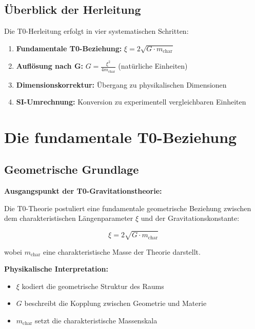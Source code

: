 \documentclass[12pt,a4paper]{article}
\begin{document}
	\subsection{Überblick der Herleitung}
	
	Die T0-Herleitung erfolgt in vier systematischen Schritten:
	
	\begin{enumerate}
		\item \textbf{Fundamentale T0-Beziehung:} $\xi = 2\sqrt{G \cdot m_{\text{char}}}$
		\item \textbf{Auflösung nach G:} $G = \frac{\xi^2}{4m_{\text{char}}}$ (natürliche Einheiten)
		\item \textbf{Dimensionskorrektur:} Übergang zu physikalischen Dimensionen
		\item \textbf{SI-Umrechnung:} Konversion zu experimentell vergleichbaren Einheiten
	\end{enumerate}
	
	\section{Die fundamentale T0-Beziehung}
	
	\subsection{Geometrische Grundlage}
	
	\begin{derivation}
		\textbf{Ausgangspunkt der T0-Gravitationstheorie:}
		
		Die T0-Theorie postuliert eine fundamentale geometrische Beziehung zwischen dem charakteristischen Längenparameter $\xi$ und der Gravitationskonstante:
		
		\begin{equation}
			\xi = 2\sqrt{G \cdot m_{\text{char}}}
			\label{eq:t0_fundamental}
		\end{equation}
		
		wobei $m_{\text{char}}$ eine charakteristische Masse der Theorie darstellt.
		
		\textbf{Physikalische Interpretation:}
		\begin{itemize}
			\item $\xi$ kodiert die geometrische Struktur des Raums
			\item $G$ beschreibt die Kopplung zwischen Geometrie und Materie
			\item $m_{\text{char}}$ setzt die charakteristische Massenskala
		\end{itemize}
	\end{derivation}
	
\end{document}
